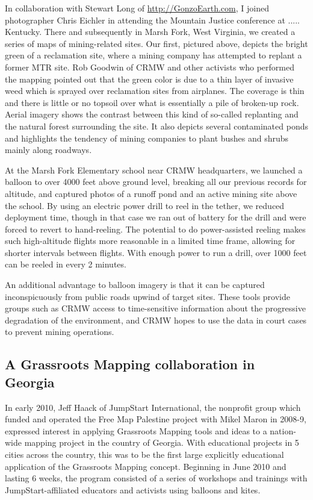 \documentclass[11pt,oneside,notitlepage]{report}
\begin{document}
In collaboration with Stewart Long of \url{http://GonzoEarth.com}, I joined photographer Chris Eichler in attending the Mountain Justice conference at ..... Kentucky. There and subsequently in Marsh Fork, West Virginia, we created a series of maps of mining-related sites. Our first, pictured above, depicts the bright green of a reclamation site, where a mining company has attempted to replant a former MTR site. Rob Goodwin of CRMW and other activists who performed the mapping pointed out that the green color is due to a thin layer of invasive weed which is sprayed over reclamation sites from airplanes. The coverage is thin and there is little or no topsoil over what is essentially a pile of broken-up rock. Aerial imagery shows the contrast between this kind of so-called replanting and the natural forest surrounding the site. It also depicts several contaminated ponds and highlights the tendency of mining companies to plant bushes and shrubs mainly along roadways. 

At the Marsh Fork Elementary school near CRMW headquarters, we launched a balloon to over 4000 feet above ground level, breaking all our previous records for altitude, and captured photos of a runoff pond and an active mining site above the school. By using an electric power drill to reel in the tether, we reduced deployment time, though in that case we ran out of battery for the drill and were forced to revert to hand-reeling. The potential to do power-assisted reeling makes such high-altitude flights more reasonable in a limited time frame, allowing for shorter intervals between flights. With enough power to run a drill, over 1000 feet can be reeled in every 2 minutes. 

An additional advantage to balloon imagery is that it can be captured inconspicuously from public roads upwind of target sites. These tools provide groups such as CRMW access to time-sensitive information about the progressive degradation of the environment, and CRMW hopes to use the data in court cases to prevent mining operations.

\subsection{A Grassroots Mapping collaboration in Georgia}
\label{subsec:georgia}

In early 2010, Jeff Haack of JumpStart International, the nonprofit group which funded and operated the Free Map Palestine project with Mikel Maron in 2008-9, expressed interest in applying Grassroots Mapping tools and ideas to a nation-wide mapping project in the country of Georgia. With educational projects in 5 cities across the country, this was to be the first large explicitly educational application of the Grassroots Mapping concept. Beginning in June 2010 and lasting 6 weeks, the program consisted of a series of workshops and trainings with JumpStart-affiliated educators and activists using balloons and kites.
\end{document}
